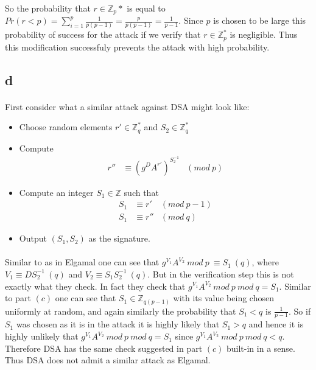 \documentclass[letterpaper,12pt,oneside,onecolumn]{report}
\begin{document}
\paragraph{}
So the probability that $r \in \mathbb{Z}_p*$ is equal to $Pr(r < p) = \sum_{i=1}^p \frac{1}{p(p-1)} = \frac{p}{p(p-1)} = \frac{1}{p-1}$. Since $p$ is chosen to be large this probability of success for the attack if we verify that $r \in \mathbb{Z}_p^*$ is negligible. Thus this modification successfuly prevents the attack with high probability.
\subsection*{d}
\paragraph{}
First consider what a similar attack against DSA might look like:
\begin{itemize}
\item Choose random elements $r' \in \mathbb{Z}_q^*$ and $S_2 \in \mathbb{Z}_q^*$
\item Compute
\begin{align*}
r'' &\equiv (g^DA^{r'})^{S_2^{-1}} &(mod\ p)
\end{align*}
\item Compute an integer $S_1 \in \mathbb{Z}$ such that
\begin{align*}
S_1 &\equiv r' &(mod\ p-1)\\
S_1 &\equiv r'' &(mod\ q)
\end{align*}
\item Output $(S_1,S_2)$ as the signature.
\end{itemize}
\paragraph{}
Similar to as in Elgamal one can see that $g^{V_1}A^{V_2}\ mod\ p\  \equiv S_1\ (q)$, where $V_1 \equiv DS_2^{-1}\ (q)$ and $V_2 \equiv S_1S_2^{-1}\ (q)$. But in the verification step this is not exactly what they check. In fact they check that $g^{V_1}A^{V_2}\ mod\ p\ mod\ q = S_1$. Similar to part $(c)$ one can see that $S_1 \in \mathbb{Z}_{q(p-1)}$ with its value being chosen uniformly at random, and again similarly the probability that $S_1 < q$ is $\frac{1}{p-1}$. So if $S_1$ was chosen as it is in the attack it is highly likely that $S_1 > q$ and hence it is highly unlikely that $g^{V_1}A^{V_2}\ mod\ p\ mod\ q = S_1$ since $g^{V_1}A^{V_2}\ mod\ p\ mod\ q < q$. Therefore DSA has the same check suggested in part $(c)$ built-in in a sense. Thus DSA does not admit a similar attack as Elgamal.
\end{document}
